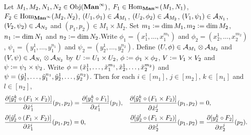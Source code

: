 \documentclass{book}
\begin{document}
	\begin{ex}
		Let $M_1, M_2, N_1, N_2 \in \operatorname{Obj}(\operatorname*{\text{\textbf{Man}}^{\infty}})$, $F_1 \in \operatorname{Hom}_{\operatorname*{\text{\textbf{Man}}^{\infty}}}(M_1, N_1)$, $F_2 \in \operatorname{Hom}_{\operatorname*{\text{\textbf{Man}}^{\infty}}}(M_2, N_2)$, $(U_1, \phi_1) \in \mathcal{A}_{M_1}$, $(U_2, \phi_2) \in \mathcal{A}_{M_2}$, $(V_1, \psi_1) \in \mathcal{A}_{N_1}$, $(V_2, \psi_2) \in \mathcal{A}_{N_2}$ and $(p_1, p_2) \in M_1 \times M_2$. Set $m_1 \vcentcolon= \dim M_1, m_2 \vcentcolon= \dim M_2$, $n_1 \vcentcolon= \dim N_1$ and $n_2 \vcentcolon= \dim N_2$.Write $\phi_1 = (x_1^1, \ldots, x_1^{m_1})$ and $\phi_2 = (x_2^1, \ldots, x_2^{m_2})$, $\psi_1 = (y_1^1, \ldots, y_1^{n_1})$ and $\psi_2 = (y_2^1, \ldots, y_2^{n_2})$. Define $(U, \phi) \in \mathcal{A}_{M_1} \otimes \mathcal{A}_{M_2}$ and $(V, \psi) \in \mathcal{A}_{N_1} \otimes \mathcal{A}_{N_2}$ by $U \vcentcolon= U_1 \times U_2$, $\phi \vcentcolon= \phi_1 \times \phi_2$, $V \vcentcolon= V_1 \times V_2$ and $\psi \vcentcolon= \psi_1 \times \psi_2$. Write $\phi = (\tilde{x}_1^1, \ldots, \tilde{x}_1^{m_1}, \tilde{x}_2^1, \ldots, \tilde{x}_2^{m_2})$ and $\psi = (\tilde{y}_1^1, \ldots, \tilde{y}_1^{n_1}, \tilde{y}_2^1, \ldots, \tilde{y}_2^{n_2})$. Then for each $i \in [m_1]$, $j \in [m_2]$, $k \in [n_1]$ and $l \in [n_2]$,
		\begin{align*}
			& \frac{\partial [\tilde{y}_1^k \circ (F_1 \times F_2)]}{\partial \tilde{x}_1^i}(p_1, p_2) = \frac{\partial [y^k_1 \circ F_1]}{\partial x_1^i} (p_1), 
			& \frac{\partial [\tilde{y}_1^k \circ (F_1 \times F_2)]}{\partial \tilde{x}_2^j}(p_1, p_2) & = 0, \\
			& \frac{\partial [\tilde{y}_2^l \circ (F_1 \times F_2)]}{\partial \tilde{x}_1^i}(p_1, p_2) = 0, 
			& \frac{\partial [\tilde{y}_2^l \circ (F_1 \times F_2)]}{\partial \tilde{x}_2^j}(p_1, p_2) &=  \frac{\partial [y^k_2 \circ F_2]}{\partial x_2^j} (p_2).
		\end{align*}
	\end{ex}
\end{document}
